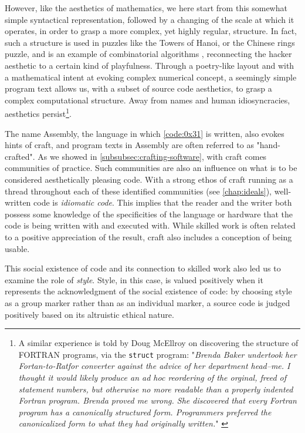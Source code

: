 However, like the aesthetics of mathematics, we here start from this somewhat simple syntactical representation, followed by a changing of the scale at which it operates, in order to grasp a more complex, yet highly regular, structure. In fact, such a structure is used in puzzles like the Towers of Hanoi, or the Chinese rings puzzle, and is an example of combinatorial algorithms \citep{knuth_art_2011}, reconnecting the hacker aesthetic to a certain kind of playfulness. Through a poetry-like layout and with a mathematical intent at evoking complex numerical concept, a seemingly simple program text allows us, with a subset of source code aesthetics, to grasp a complex computational structure. Away from names and human idiosyncracies, aesthetics persist\footnote{A similar experience is told by Doug McEllroy on discovering the structure of FORTRAN programs, via the \lstinline{struct} program: "\emph{Brenda Baker undertook her Fortan-to-Ratfor converter against the advice of her department head--me. I thought it would likely produce an ad hoc reordering of the orginal, freed of statement numbers, but otherwise no more readable than a properly indented Fortran program. Brenda proved me wrong. She discovered that every Fortran program has a canonically structured form. Programmers preferred the canonicalized form to what they had originally written.}" \citep{mcillroy_tuhs_2020}}.

The name Assembly, the language in which \autoref{code:0x31} is written, also evokes hints of craft, and program texts in Assembly are often referred to as "hand-crafted". As we showed in \autoref{subsubsec:crafting-software}, with craft comes communities of practice. Such communities are also an influence on what is to be considered aesthetically pleasing code.  With a strong ethos of craft running as a thread throughout each of these identified communities (see \autoref{chap:ideals}), well-written code is \emph{idiomatic code}. This implies that the reader and the writer both possess some knowledge of the specificities of the language or hardware that the code is being written with and executed with. While skilled work is often related to a positive appreciation of the result, craft also includes a conception of being usable.

This social existence of code and its connection to skilled work also led us to examine the role of \emph{style}. Style, in this case, is valued positively when it represents the acknowledgment of the social existence of code: by choosing style as a group marker rather than as an individual marker, a source code is judged positively based on its altruistic ethical nature.

